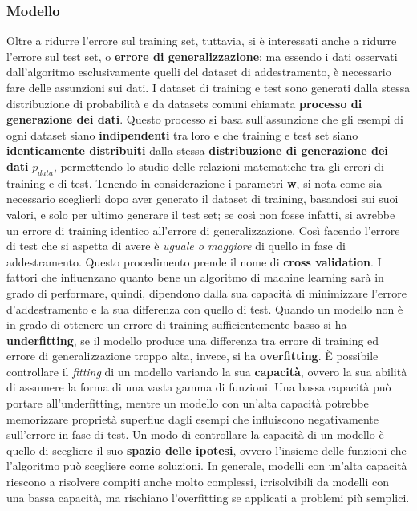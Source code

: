 \documentclass[12pt,a4paper]{report}
\begin{document}
    \subsubsection{Modello} \label{sec:crossval}
    Oltre a ridurre l'errore sul training set, tuttavia, si \`e 
    interessati anche a ridurre l'errore sul test set, o \textbf{errore
    di generalizzazione}; ma essendo i dati osservati dall'algoritmo 
    esclusivamente quelli del dataset di addestramento, \`e necessario
    fare delle assunzioni sui dati. I dataset di training e test sono
    generati dalla stessa distribuzione di probabilit\`a e da datasets
    comuni chiamata \textbf{processo di generazione dei dati}. Questo
    processo si basa sull'assunzione che gli esempi di ogni dataset 
    siano \textbf{indipendenti} tra loro e che training e test set siano
    \textbf{identicamente distribuiti} dalla stessa 
    \textbf{distribuzione di generazione dei dati} $p_{data}$,
    permettendo lo studio delle relazioni matematiche tra gli errori di
    training e di test. Tenendo in considerazione i parametri \textbf{w}, 
    si nota come sia necessario sceglierli dopo aver generato il
    dataset di training, basandosi sui suoi valori, e solo per ultimo
    generare il test set; se cos\`i non fosse infatti, si avrebbe un 
    errore di training identico all'errore di generalizzazione. Cos\`i
    facendo l'errore di test che si aspetta di avere \`e \textit{uguale
    o maggiore} di quello in fase di addestramento. Questo procedimento
    prende il nome di \textbf{cross validation}. I fattori che
    influenzano quanto bene un algoritmo di machine learning sar\`a in
    grado di performare, quindi, dipendono dalla sua capacit\`a di 
    minimizzare l'errore d'addestramento e la sua differenza con quello
    di test. Quando un modello non \`e in grado di ottenere un errore
    di training sufficientemente basso si ha \textbf{underfitting}, se
    il modello produce una differenza tra errore di training ed errore
    di generalizzazione troppo alta, invece, si ha \textbf{overfitting}.
    \`E possibile controllare il \textit{fitting} di un modello variando
    la sua \textbf{capacit\`a}, ovvero la sua abilit\`a di assumere la
    forma di una vasta gamma di funzioni. Una bassa capacit\`a pu\`o
    portare all'underfitting, mentre un modello con un'alta capacit\`a 
    potrebbe memorizzare propriet\`a superflue dagli esempi che 
    influiscono negativamente sull'errore in fase di test. Un modo di 
    controllare la capacit\`a di un modello \`e quello di scegliere il suo
    \textbf{spazio delle ipotesi}, ovvero l'insieme delle funzioni che
    l'algoritmo pu\`o scegliere come soluzioni. In generale, modelli
    con un'alta capacit\`a riescono a risolvere compiti anche molto
    complessi, irrisolvibili da modelli con una bassa capacit\`a, ma 
    rischiano l'overfitting se applicati a problemi pi\`u semplici.
    
\end{document}
